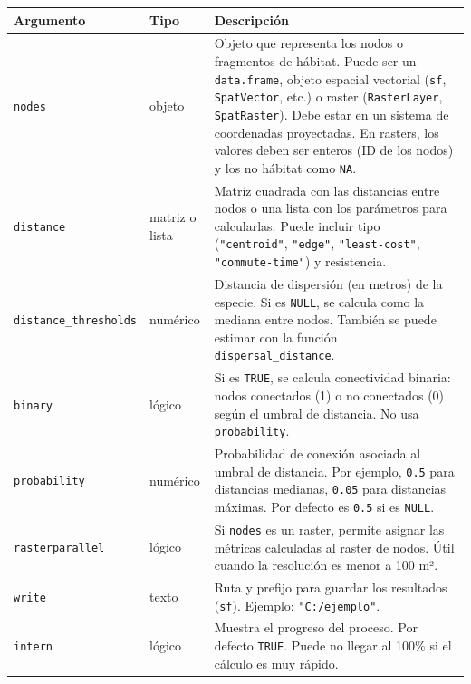 \documentclass[
]{book}
\begin{document}
\begin{longtable}[]{@{}
  >{\raggedright\arraybackslash}p{}
  >{\raggedright\arraybackslash}p{}
  >{\raggedright\arraybackslash}p{}@{}}
\toprule\noalign{}
\begin{minipage}[b]{\linewidth}\raggedright
Argumento
\end{minipage} & \begin{minipage}[b]{\linewidth}\raggedright
Tipo
\end{minipage} & \begin{minipage}[b]{\linewidth}\raggedright
Descripción
\end{minipage} \\
\midrule\noalign{}
\endhead
\bottomrule\noalign{}
\endlastfoot
\texttt{nodes} & objeto & Objeto que representa los nodos o fragmentos de hábitat. Puede ser un \texttt{data.frame}, objeto espacial vectorial (\texttt{sf}, \texttt{SpatVector}, etc.) o raster (\texttt{RasterLayer}, \texttt{SpatRaster}). Debe estar en un sistema de coordenadas proyectadas. En rasters, los valores deben ser enteros (ID de los nodos) y los no hábitat como \texttt{NA}. \\
\texttt{distance} & matriz o lista & Matriz cuadrada con las distancias entre nodos o una lista con los parámetros para calcularlas. Puede incluir tipo (\texttt{"centroid"}, \texttt{"edge"}, \texttt{"least-cost"}, \texttt{"commute-time"}) y resistencia. \\
\texttt{distance\_thresholds} & numérico & Distancia de dispersión (en metros) de la especie. Si es \texttt{NULL}, se calcula como la mediana entre nodos. También se puede estimar con la función \texttt{dispersal\_distance}. \\
\texttt{binary} & lógico & Si es \texttt{TRUE}, se calcula conectividad binaria: nodos conectados (1) o no conectados (0) según el umbral de distancia. No usa \texttt{probability}. \\
\texttt{probability} & numérico & Probabilidad de conexión asociada al umbral de distancia. Por ejemplo, \texttt{0.5} para distancias medianas, \texttt{0.05} para distancias máximas. Por defecto es \texttt{0.5} si es \texttt{NULL}. \\
\texttt{rasterparallel} & lógico & Si \texttt{nodes} es un raster, permite asignar las métricas calculadas al raster de nodos. Útil cuando la resolución es menor a 100 m². \\
\texttt{write} & texto & Ruta y prefijo para guardar los resultados (\texttt{sf}). Ejemplo: \texttt{"C:/ejemplo"}. \\
\texttt{intern} & lógico & Muestra el progreso del proceso. Por defecto \texttt{TRUE}. Puede no llegar al 100\% si el cálculo es muy rápido. \\
\end{longtable}
\end{document}
